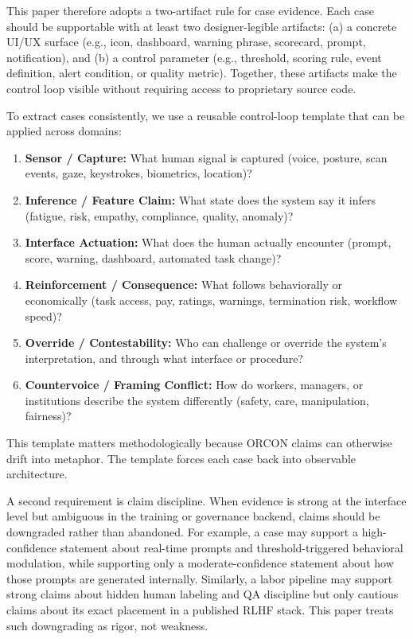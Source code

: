 \documentclass[runningheads]{llncs}
\begin{document}
This paper therefore adopts a two-artifact rule for case evidence. Each case should be supportable with at least two designer-legible artifacts: (a) a concrete UI/UX surface (e.g., icon, dashboard, warning phrase, scorecard, prompt, notification), and (b) a control parameter (e.g., threshold, scoring rule, event definition, alert condition, or quality metric). Together, these artifacts make the control loop visible without requiring access to proprietary source code.

To extract cases consistently, we use a reusable control-loop template that can be applied across domains:
\begin{enumerate}
\item \textbf{Sensor / Capture:} What human signal is captured (voice, posture, scan events, gaze, keystrokes, biometrics, location)?
\item \textbf{Inference / Feature Claim:} What state does the system say it infers (fatigue, risk, empathy, compliance, quality, anomaly)?
\item \textbf{Interface Actuation:} What does the human actually encounter (prompt, score, warning, dashboard, automated task change)?
\item \textbf{Reinforcement / Consequence:} What follows behaviorally or economically (task access, pay, ratings, warnings, termination risk, workflow speed)?
\item \textbf{Override / Contestability:} Who can challenge or override the system's interpretation, and through what interface or procedure?
\item \textbf{Countervoice / Framing Conflict:} How do workers, managers, or institutions describe the system differently (safety, care, manipulation, fairness)?
\end{enumerate}

This template matters methodologically because ORCON claims can otherwise drift into metaphor. The template forces each case back into observable architecture.

A second requirement is claim discipline. When evidence is strong at the interface level but ambiguous in the training or governance backend, claims should be downgraded rather than abandoned. For example, a case may support a high-confidence statement about real-time prompts and threshold-triggered behavioral modulation, while supporting only a moderate-confidence statement about how those prompts are generated internally. Similarly, a labor pipeline may support strong claims about hidden human labeling and QA discipline but only cautious claims about its exact placement in a published RLHF stack. This paper treats such downgrading as rigor, not weakness.
\end{document}
